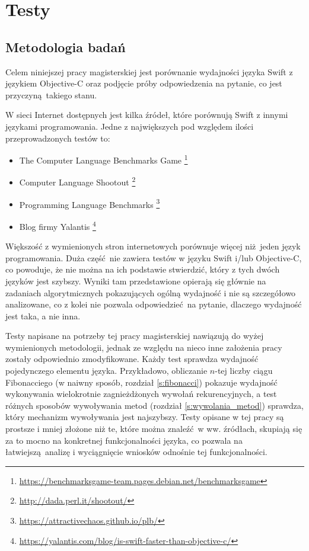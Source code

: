 \documentclass[mgr, shortabstract]{iithesis}
\begin{document}
\chapter{Testy}
\label{ch:testy}

\section{Metodologia badań}

Celem niniejszej pracy magisterskiej jest porównanie wydajności języka Swift z językiem Objective-C oraz podjęcie próby odpowiedzenia na pytanie, co jest przyczyną takiego stanu.

W sieci Internet dostępnych jest kilka źródeł, które porównują Swift z innymi językami programowania. Jedne z największych pod względem ilości przeprowadzonych testów to:
\begin{itemize}
    \item The Computer Language Benchmarks Game \footnote{\url{https://benchmarksgame-team.pages.debian.net/benchmarksgame}}
    \item Computer Language Shootout \footnote{\url{http://dada.perl.it/shootout/}}
    \item Programming Language Benchmarks \footnote{\url{https://attractivechaos.github.io/plb/}}
    \item Blog firmy Yalantis \footnote{\url{https://yalantis.com/blog/is-swift-faster-than-objective-c/}}
\end{itemize}

Większość z wymienionych stron internetowych porównuje więcej niż jeden język programowania. Duża część nie zawiera testów w języku Swift i/lub Objective-C, co powoduje, że nie można na ich podstawie stwierdzić, który z tych dwóch języków jest szybszy. Wyniki tam przedstawione opierają się głównie na zadaniach algorytmicznych pokazujących ogólną wydajność i nie są szczegółowo analizowane, co z kolei nie pozwala odpowiedzieć na pytanie, dlaczego wydajność jest taka, a nie inna. 

Testy napisane na potrzeby tej pracy magisterskiej nawiązują do wyżej wymienionych metodologii, jednak ze względu na nieco inne założenia pracy zostały odpowiednio zmodyfikowane. Każdy test sprawdza wydajność pojedynczego elementu języka. Przykładowo, obliczanie $n$-tej liczby ciągu Fibonacciego (w naiwny sposób, rozdział \ref{s:fibonacci}) pokazuje wydajność wykonywania wielokrotnie zagnieżdżonych wywołań rekurencyjnych, a test różnych sposobów wywoływania metod (rozdział \ref{s:wywolania_metod}) sprawdza, który mechanizm wywoływania jest najszybszy. Testy opisane w tej pracy są prostsze i mniej złożone niż te, które można znaleźć w ww. źródłach, skupiają się za to mocno na konkretnej funkcjonalności języka, co pozwala na łatwiejszą analizę i wyciągnięcie wniosków odnośnie tej funkcjonalności.
\end{document}

